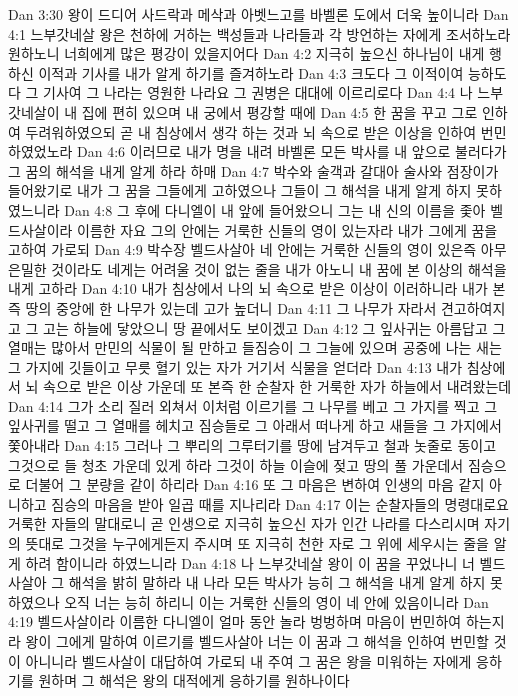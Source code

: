 Dan 3:30  왕이 드디어 사드락과 메삭과 아벳느고를 바벨론 도에서 더욱 높이니라
Dan 4:1  느부갓네살 왕은 천하에 거하는 백성들과 나라들과 각 방언하는 자에게 조서하노라 원하노니 너희에게 많은 평강이 있을지어다
Dan 4:2  지극히 높으신 하나님이 내게 행하신 이적과 기사를 내가 알게 하기를 즐겨하노라
Dan 4:3  크도다 그 이적이여 능하도다 그 기사여 그 나라는 영원한 나라요 그 권병은 대대에 이르리로다
Dan 4:4  나 느부갓네살이 내 집에 편히 있으며 내 궁에서 평강할 때에
Dan 4:5  한 꿈을 꾸고 그로 인하여 두려워하였으되 곧 내 침상에서 생각 하는 것과 뇌 속으로 받은 이상을 인하여 번민하였었노라
Dan 4:6  이러므로 내가 명을 내려 바벨론 모든 박사를 내 앞으로 불러다가 그 꿈의 해석을 내게 알게 하라 하매
Dan 4:7  박수와 술객과 갈대아 술사와 점장이가 들어왔기로 내가 그 꿈을 그들에게 고하였으나 그들이 그 해석을 내게 알게 하지 못하였느니라
Dan 4:8  그 후에 다니엘이 내 앞에 들어왔으니 그는 내 신의 이름을 좇아 벨드사살이라 이름한 자요 그의 안에는 거룩한 신들의 영이 있는자라 내가 그에게 꿈을 고하여 가로되
Dan 4:9  박수장 벨드사살아 네 안에는 거룩한 신들의 영이 있은즉 아무 은밀한 것이라도 네게는 어려울 것이 없는 줄을 내가 아노니 내 꿈에 본 이상의 해석을 내게 고하라
Dan 4:10  내가 침상에서 나의 뇌 속으로 받은 이상이 이러하니라 내가 본즉 땅의 중앙에 한 나무가 있는데 고가 높더니
Dan 4:11  그 나무가 자라서 견고하여지고 그 고는 하늘에 닿았으니 땅 끝에서도 보이겠고
Dan 4:12  그 잎사귀는 아름답고 그 열매는 많아서 만민의 식물이 될 만하고 들짐승이 그 그늘에 있으며 공중에 나는 새는 그 가지에 깃들이고 무릇 혈기 있는 자가 거기서 식물을 얻더라
Dan 4:13  내가 침상에서 뇌 속으로 받은 이상 가운데 또 본즉 한 순찰자 한 거룩한 자가 하늘에서 내려왔는데
Dan 4:14  그가 소리 질러 외쳐서 이처럼 이르기를 그 나무를 베고 그 가지를 찍고 그 잎사귀를 떨고 그 열매를 헤치고 짐승들로 그 아래서 떠나게 하고 새들을 그 가지에서 쫓아내라
Dan 4:15  그러나 그 뿌리의 그루터기를 땅에 남겨두고 철과 놋줄로 동이고 그것으로 들 청초 가운데 있게 하라 그것이 하늘 이슬에 젖고 땅의 풀 가운데서 짐승으로 더불어 그 분량을 같이 하리라
Dan 4:16  또 그 마음은 변하여 인생의 마음 같지 아니하고 짐승의 마음을 받아 일곱 때를 지나리라
Dan 4:17  이는 순찰자들의 명령대로요 거룩한 자들의 말대로니 곧 인생으로 지극히 높으신 자가 인간 나라를 다스리시며 자기의 뜻대로 그것을 누구에게든지 주시며 또 지극히 천한 자로 그 위에 세우시는 줄을 알게 하려 함이니라 하였느니라
Dan 4:18  나 느부갓네살 왕이 이 꿈을 꾸었나니 너 벨드사살아 그 해석을 밝히 말하라 내 나라 모든 박사가 능히 그 해석을 내게 알게 하지 못하였으나 오직 너는 능히 하리니 이는 거룩한 신들의 영이 네 안에 있음이니라
Dan 4:19  벨드사살이라 이름한 다니엘이 얼마 동안 놀라 벙벙하며 마음이 번민하여 하는지라 왕이 그에게 말하여 이르기를 벨드사살아 너는 이 꿈과 그 해석을 인하여 번민할 것이 아니니라 벨드사살이 대답하여 가로되 내 주여 그 꿈은 왕을 미워하는 자에게 응하기를 원하며 그 해석은 왕의 대적에게 응하기를 원하나이다
